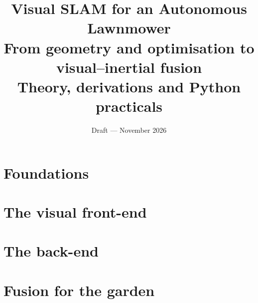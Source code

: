 \documentclass[11pt,oneside]{book}
\title{\textbf{Visual SLAM for an Autonomous Lawnmower}\\[0.5em]
  \large From geometry and optimisation to visual--inertial fusion\\
  \large Theory, derivations and Python practicals}
\author{}
\date{Draft --- November 2026}
\begin{document}
\frontmatter
\maketitle
\tableofcontents

\mainmatter

\part{Foundations}




\part{The visual front-end}



\part{The back-end}




\part{Fusion for the garden}





\backmatter

\end{document}
